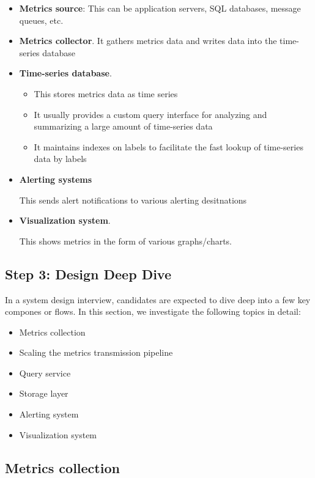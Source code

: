 \documentclass{report}
\theoremstyle{definition}
\let\oldsubsection\subsection
\renewcommand{\subsection}{\oldsubsection*}
\begin{document}
\begin{itemize}
\item
\textbf{Metrics source}: This can be application servers, SQL databases, message queues, etc.
\item
\textbf{Metrics collector}. It gathers metrics data and writes data into the time-series database
\item
\textbf{Time-series database}.

\begin{itemize}
\item
This stores metrics data as time series
\item
It usually provides a custom query interface for analyzing and summarizing a large amount of time-series data
\item
It maintains indexes on labels to facilitate the fast lookup of time-series data by labels
\end{itemize}
\item
\textbf{Alerting systems}

This sends alert notifications to various alerting desitnations
\item
\textbf{Visualization system}.

This shows metrics in the form of various graphs/charts.

\end{itemize}

\subsection{Step 3: Design Deep Dive}

In a system design interview, candidates are expected to dive deep into a few key compones or flows. In this section, we investigate the following topics in detail:

\begin{itemize}
\item
Metrics collection
\item
Scaling the metrics transmission pipeline
\item
Query service
\item
Storage layer
\item
Alerting system
\item
Visualization system
\end{itemize}

\subsection{Metrics collection}
\end{document}

